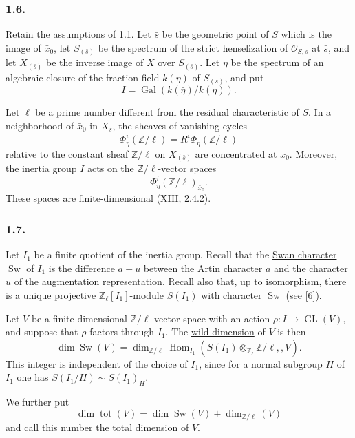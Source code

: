 \subsubsection*{1.6.}
Retain the assumptions of 1.1.  Let $\bar s$ be the geometric point
of $S$ which is the image of $\bar x_0$, let $S_{(\bar s)}$ be the
spectrum of the strict henselization of $\mathcal O_{S,s}$ at
$\bar s$, and let $X_{(\bar s)}$ be the inverse image of $X$ over
$S_{(\bar s)}$.  Let $\bar\eta$ be the spectrum of an algebraic
closure of the fraction field $k(\eta)$ of $S_{(\bar s)}$, and put
\[
I=\operatorname{Gal}(k(\bar\eta)/k(\eta)).
\]

Let $\ell$ be a prime number different from the residual
characteristic of $S$.  In a neighborhood of $\bar x_0$ in
$X_{\bar s}$, the sheaves of vanishing cycles
\[
\Phi^i_{\bar\eta}(\mathbb Z/\ell)
=R^i\Phi_{\bar\eta}(\mathbb Z/\ell)
\]
relative to the constant sheaf $\mathbb Z/\ell$ on
$X_{(\bar s)}$ are concentrated at $\bar x_0$.  Moreover, the
inertia group $I$ acts on the $\mathbb Z/\ell$-vector spaces
\[
\Phi^i_{\bar\eta}(\mathbb Z/\ell)_{\bar x_0}.
\]
These spaces are finite-dimensional (XIII, 2.4.2).

\subsubsection*{1.7.}
Let $I_1$ be a finite quotient of the inertia group.  Recall that
the \underline{Swan character} $\operatorname{Sw}$ of $I_1$ is the
difference $a-u$ between the Artin character $a$ and the character
$u$ of the augmentation representation.  Recall also that, up to
isomorphism, there is a unique projective $\mathbb Z_\ell[I_1]$-module
$S(I_1)$ with character $\operatorname{Sw}$ (see [6]).

Let $V$ be a finite-dimensional $\mathbb Z/\ell$-vector space with
an action $\rho:I\to\operatorname{GL}(V)$, and suppose that $\rho$
factors through $I_1$.  The \underline{wild dimension} of $V$ is
then
\begin{equation}\tag{1.7.1}
\dim\operatorname{Sw}(V)
=\dim_{\mathbb Z/\ell}
\operatorname{Hom}_{I_1}\!\left(
S(I_1)\otimes_{\mathbb Z_\ell}\mathbb Z/\ell,,V\right).
\end{equation}
This integer is independent of the choice of $I_1$, since for a
normal subgroup $H$ of $I_1$ one has
$S(I_1/H)\sim S(I_1)_H$.

We further put
\[
\dim\operatorname{tot}(V)
=\dim\operatorname{Sw}(V)+\dim_{\mathbb Z/\ell}(V)
\]
and call this number the \underline{total dimension} of $V$.

